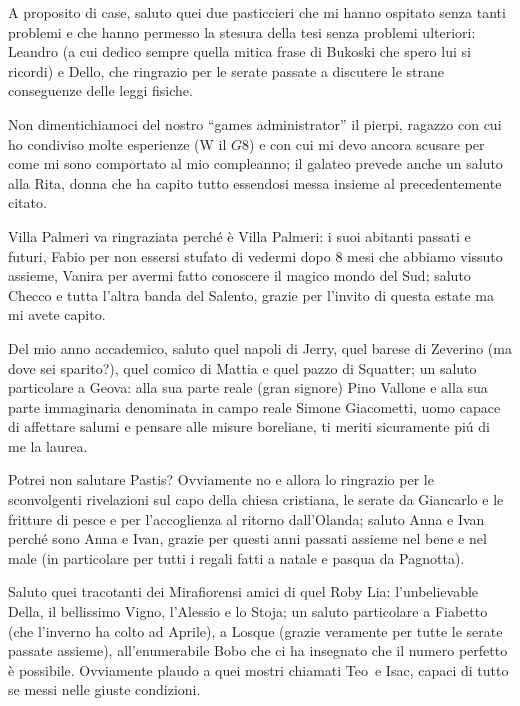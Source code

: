 \par
A proposito di case, saluto quei due pasticcieri che mi hanno ospitato senza tanti problemi e che hanno permesso la stesura della tesi senza problemi ulteriori:   Leandro (a cui dedico sempre quella mitica frase di Bukoski che spero lui si ricordi) e Dello, che ringrazio per le serate passate a discutere le strane conseguenze delle leggi fisiche.
\par
Non dimentichiamoci del nostro ``games administrator'' il pierpi, ragazzo con cui ho condiviso molte esperienze (W il $G8$) e con cui mi devo ancora scusare per come mi sono comportato al mio compleanno; il galateo prevede anche un saluto alla Rita, donna che ha capito tutto essendosi messa insieme al precedentemente citato.
\par
Villa Palmeri va ringraziata perch\'e \`e Villa Palmeri: i suoi abitanti passati e futuri, Fabio per non essersi stufato di vedermi dopo $8$ mesi che abbiamo vissuto assieme, Vanira per avermi fatto conoscere il magico mondo del Sud; saluto Checco e tutta l'altra banda del Salento, grazie per l'invito di questa estate ma mi avete capito.
\par
Del mio anno accademico, saluto quel napoli di Jerry, quel barese di Zeverino (ma dove sei sparito?), quel comico di Mattia e quel pazzo di Squatter; un saluto particolare a Geova: alla sua parte reale (gran signore) Pino Vallone e alla sua parte immaginaria denominata in campo reale Simone Giacometti, uomo capace di affettare salumi e pensare alle misure boreliane, ti meriti sicuramente pi\'u di me la laurea.
\par 
Potrei non salutare Pastis? Ovviamente no e allora lo ringrazio per le sconvolgenti rivelazioni sul capo della chiesa cristiana, le serate da Giancarlo e le fritture di pesce e per l'accoglienza al ritorno dall'Olanda; saluto Anna e Ivan perch\'e sono Anna e Ivan, grazie per questi anni passati assieme nel bene e nel male (in particolare per tutti i regali fatti a natale e pasqua da Pagnotta).
\par
Saluto quei tracotanti dei Mirafiorensi amici di quel Roby Lia: l'unbelievable Della, il bellissimo Vigno, l'Alessio e lo Stoja; un saluto particolare a Fiabetto (che l'inverno ha colto ad Aprile), a Losque (grazie veramente per tutte le serate passate assieme), all'enumerabile Bobo che ci ha insegnato che il numero perfetto \`e possibile. Ovviamente plaudo a quei mostri chiamati Teo\ e Isac, capaci di tutto se messi nelle giuste condizioni.
